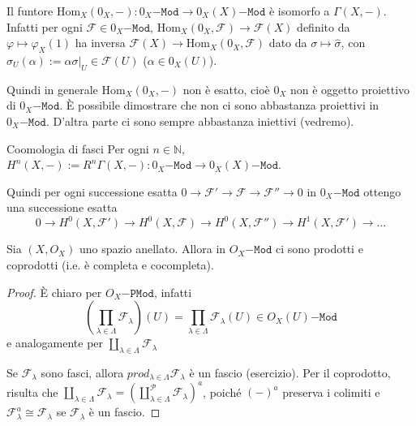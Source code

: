 \begin{remark}{}
    Il funtore \(\mathrm{Hom}_X{(0_X, -)} : 0_X\mathtt{-Mod} \to
    0_X{(X)}\mathtt{-Mod}\) è isomorfo a \(\Gamma{(X, -)}\).
    Infatti per ogni \(\mathcal{F} \in 0_X\mathtt{-Mod}\),
    \(\mathrm{Hom}_X{(0_X, \mathcal{F})} \to \mathcal{F}{(X)}\) definito da
    \(\varphi  \mapsto \varphi _X{(1)}\) ha inversa \(\mathcal{F}{(X)} \to
    \mathrm{Hom}_X{(0_X, \mathcal{F})}\) dato da \(\sigma \mapsto
    \widehat{\sigma}\), con \(\widehat{\sigma}_U{(\alpha)} := \alpha \sigma|_U
    \in \mathcal{F}{(U)}\) (\(\alpha \in 0_X{(U)}\)).

    Quindi in generale \(\mathrm{Hom}_X{(0_X,-)}\) non è esatto, cioè \(0_X\)
    non è oggetto proiettivo di \(0_X\mathtt{-Mod}\).
    È possibile dimostrare che non ci sono abbastanza proiettivi in
    \(0_X\mathtt{-Mod}\). D'altra parte ci sono sempre abbastanza iniettivi
    (vedremo).
\end{remark}

\begin{definition}{Coomologia di fasci}
    Per ogni \(n \in \mathbb{N}\), \(H^{n}{(X, -)} := R^{n}\Gamma{(X, -)} :
    0_X\mathtt{-Mod} \to 0_X{(X)}\mathtt{-Mod}\).

    Quindi per ogni successione esatta \(0 \to \mathcal{F}' \to \mathcal{F} \to
    \mathcal{F}'' \to 0\) in \(0_X\mathtt{-Mod}\) ottengo una successione esatta
    \[
      0 \to H^{0}{(X, \mathcal{F}')} \to H^{0}{(X, \mathcal{F})} \to H^{0}{(X,
      \mathcal{F}'')} \to H^{1}{(X, \mathcal{F}')} \to \dots
    \]
\end{definition}

\begin{proposition}{}
    Sia \({(X, O_X)}\) uno spazio anellato. Allora in \(O_X\mathtt{-Mod}\) ci
    sono prodotti e coprodotti (i.e. è completa e cocompleta).
\end{proposition}
\begin{proof}{}
    È chiaro per \(O_X\mathtt{-PMod}\), infatti
    \[
      {(\prod_{\lambda \in \Lambda} \mathcal{F}_\lambda)} {(U)} = \prod_{\lambda
      \in \Lambda} \mathcal{F}_\lambda{(U)} \in O_X{(U)}\mathtt{-Mod} 
    \]
    e analogamente per \(\coprod_{\lambda \in \Lambda} \mathcal{F}_\lambda\) 

    Se \(\mathcal{F}_\lambda\) sono fasci, allora \(prod_{\lambda \in \Lambda}
    \mathcal{F}_\lambda\) è un fascio (esercizio). %
    Per il coprodotto, risulta che \(\coprod_{\lambda \in \Lambda}
    \mathcal{F}_\lambda = {\left( \coprod^{\mathcal{P}}_{\lambda \in \Lambda}
    \mathcal{F}_\lambda \right)} ^{a}\), poiché \({(-)}^{a}\) preserva i
    colimiti e \(\mathcal{F}_\lambda^{a}\cong \mathcal{F}_\lambda\) se
    \(\mathcal{F}_\lambda\) è un fascio.
\end{proof}

